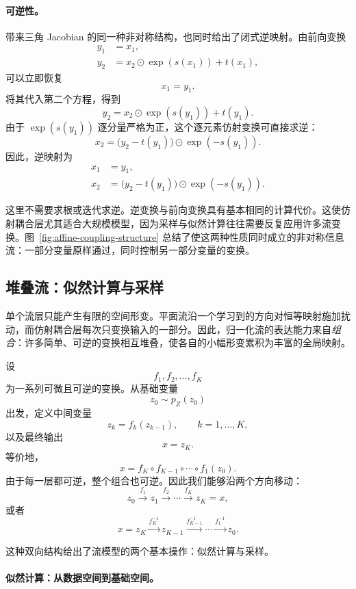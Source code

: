 \paragraph{可逆性。}

带来三角 Jacobian 的同一种非对称结构，也同时给出了闭式逆映射。由前向变换
\[
\begin{aligned}
y_1 &= x_1,\\
y_2 &= x_2\odot \exp(s(x_1)) + t(x_1),
\end{aligned}
\]
可以立即恢复
\[
x_1=y_1.
\]
将其代入第二个方程，得到
\[
y_2
=
x_2\odot \exp(s(y_1)) + t(y_1).
\]
由于 $\exp(s(y_1))$ 逐分量严格为正，这个逐元素仿射变换可直接求逆：
\[
x_2
=
\bigl(y_2-t(y_1)\bigr)\odot \exp(-s(y_1)).
\]
因此，逆映射为
\[
\boxed{
\begin{aligned}
x_1 &= y_1,\\
x_2 &= \bigl(y_2-t(y_1)\bigr)\odot \exp(-s(y_1)).
\end{aligned}
}
\]

这里不需要求根或迭代求逆。逆变换与前向变换具有基本相同的计算代价。这使仿射耦合层尤其适合大规模模型，因为采样与似然计算往往需要反复应用许多流变换。图~\ref{fig:affine-coupling-structure} 总结了使这两种性质同时成立的非对称信息流：一部分变量原样通过，同时控制另一部分变量的变换。



\subsection{堆叠流：似然计算与采样}

单个流层只能产生有限的空间形变。平面流沿一个学习到的方向对恒等映射施加扰动，而仿射耦合层每次只变换输入的一部分。因此，归一化流的表达能力来自\emph{组合}：许多简单、可逆的变换相互堆叠，使各自的小幅形变累积为丰富的全局映射。

设
\[
f_1,f_2,\dots,f_K
\]
为一系列可微且可逆的变换。从基础变量
\[
z_0\sim p_Z(z_0)
\]
出发，定义中间变量
\[
z_k=f_k(z_{k-1}),
\qquad k=1,\dots,K,
\]
以及最终输出
\[
x=z_K.
\]
等价地，
\[
x
=
f_K\circ f_{K-1}\circ \cdots \circ f_1(z_0).
\]
由于每一层都可逆，整个组合也可逆。因此我们能够沿两个方向移动：
\[
z_0
\xrightarrow{f_1}
z_1
\xrightarrow{f_2}
\cdots
\xrightarrow{f_K}
z_K=x,
\]
或者
\[
x=z_K
\xrightarrow{f_K^{-1}}
z_{K-1}
\xrightarrow{f_{K-1}^{-1}}
\cdots
\xrightarrow{f_1^{-1}}
z_0.
\]

这种双向结构给出了流模型的两个基本操作：似然计算与采样。

\paragraph{似然计算：从数据空间到基础空间。}


